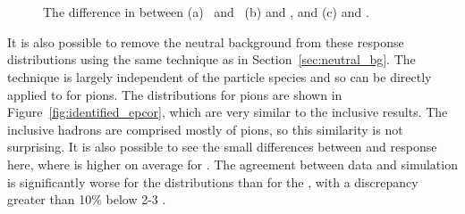 \begin{figure}[htbp]
\centering
{}
\\
~
\caption{ The difference in \epav between (a) \pip\ and \pim\, (b) \pP and \pip, and (c) \pAP and \pim.}
\label{fig:identified_epdiff}
\end{figure}

It is also possible to remove the neutral background from these response distributions using the same technique as in Section~\ref{sec:neutral_bg}. 
The technique is largely independent of the particle species and so can be directly applied to \epav for pions. 
The \epcor distributions for pions are shown in Figure~\ref{fig:identified_epcor}, which are very similar to the inclusive results.
The inclusive hadrons are comprised mostly of pions, so this similarity is not surprising.
It is also possible to see the small differences between \pip and \pim response here, where \epcor is higher on average for \pip.
The agreement between data and simulation is significantly worse for the \pim distributions than for the \pip, with a discrepancy greater than 10\% below 2-3 \GeV. 

